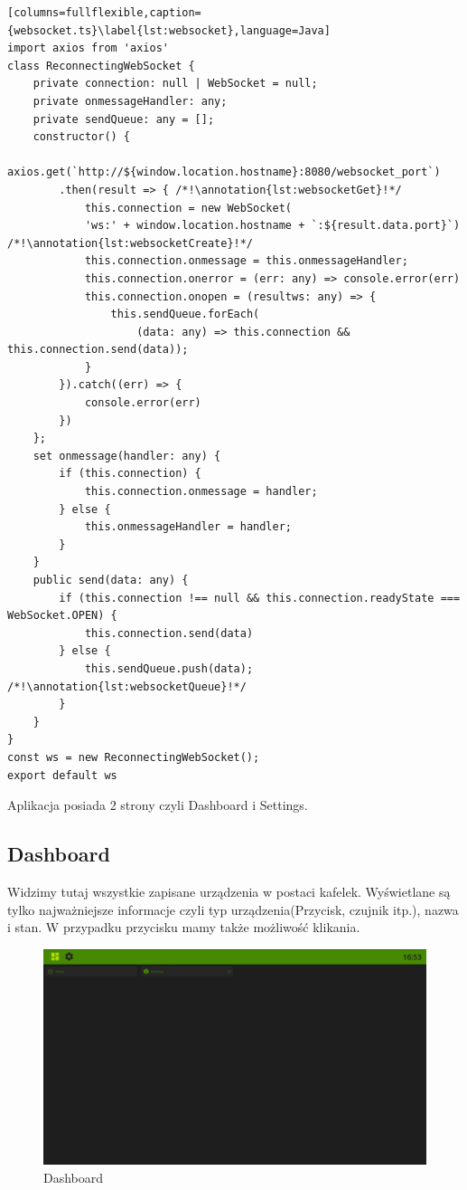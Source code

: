 \begin{lstlisting}[columns=fullflexible,caption={websocket.ts}\label{lst:websocket},language=Java]
import axios from 'axios'
class ReconnectingWebSocket {
    private connection: null | WebSocket = null;
    private onmessageHandler: any;
    private sendQueue: any = [];
    constructor() {
        axios.get(`http://${window.location.hostname}:8080/websocket_port`)
        .then(result => { /*!\annotation{lst:websocketGet}!*/
            this.connection = new WebSocket(
            'ws:' + window.location.hostname + `:${result.data.port}`) /*!\annotation{lst:websocketCreate}!*/
            this.connection.onmessage = this.onmessageHandler;
            this.connection.onerror = (err: any) => console.error(err)
            this.connection.onopen = (resultws: any) => {
                this.sendQueue.forEach(
                    (data: any) => this.connection && this.connection.send(data));
            }
        }).catch((err) => {
            console.error(err)
        })
    };
    set onmessage(handler: any) {
        if (this.connection) {
            this.connection.onmessage = handler;
        } else {
            this.onmessageHandler = handler;
        }
    }
    public send(data: any) {
        if (this.connection !== null && this.connection.readyState === WebSocket.OPEN) {
            this.connection.send(data)
        } else {
            this.sendQueue.push(data); /*!\annotation{lst:websocketQueue}!*/
        }
    }
}
const ws = new ReconnectingWebSocket();
export default ws
\end{lstlisting} \newpage
\par Aplikacja posiada 2 strony czyli Dashboard i Settings.
\subsection{Dashboard}
Widzimy tutaj wszystkie zapisane urządzenia w postaci kafelek. Wyświetlane są tylko najważniejsze informacje czyli typ urządzenia(Przycisk, czujnik itp.), nazwa i stan. W przypadku przycisku mamy także możliwość klikania. 
\begin{figure}[h]
  \includegraphics[width=\linewidth]{dashboard.png}
  \caption{Dashboard}
  \label{fig:dashboard}
\end{figure}
\newpage

